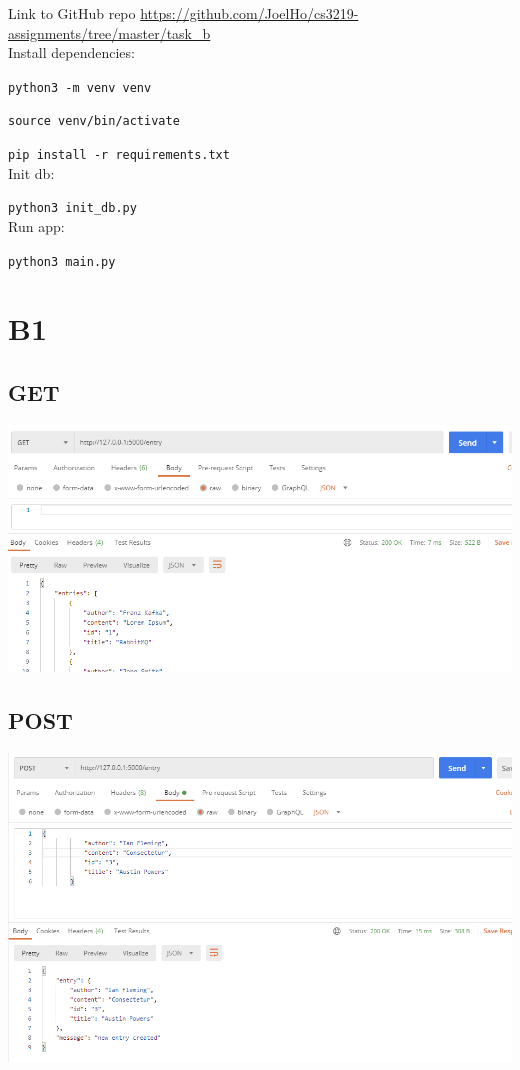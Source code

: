 \documentclass{article}
\begin{document}
    Link to GitHub repo \href{https://github.com/JoelHo/cs3219-assignments/tree/master/task_b}{https://github.com/JoelHo/cs3219-assignments/tree/master/task\_b}\\

    Install dependencies:

    \texttt{python3 -m venv venv}

    \texttt{source venv/bin/activate}

    \texttt{pip install -r requirements.txt}\\

    Init db:

    \texttt{python3 init\_db.py}\\

    Run app:

    \texttt{python3 main.py}\\

    \section*{B1}
    \subsection*{GET}

    \includegraphics[width=\textwidth]{img/get.png}\\

    \subsection*{POST}

    \includegraphics[width=\textwidth]{img/post.png}\\
\end{document}
